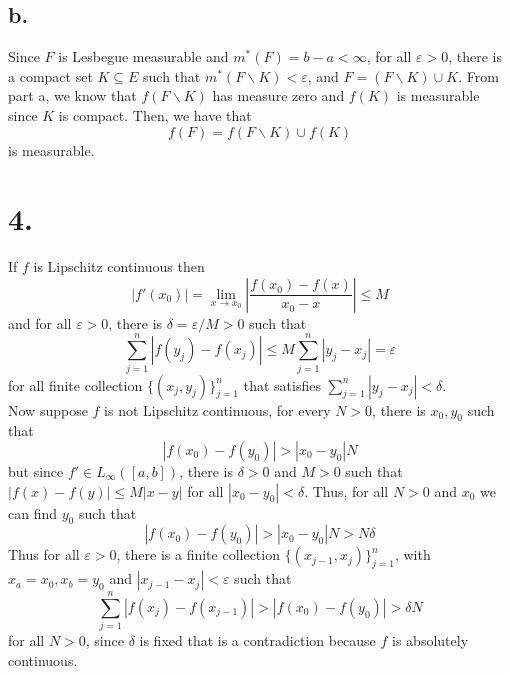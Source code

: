 \documentclass[11pt]{article}
\theoremstyle{mystyle}
\theoremstyle{definition}
\begin{document}
\subsection*{b.}
Since $F$ is Lesbegue measurable and $m^*(F) = b-a < \infty$, for all $\varepsilon > 0$, there is a compact set $K \subseteq E$ such that $m^*(F\backslash K) < \varepsilon$, and $F = (F\backslash K) \cup K$. From part a, we know that $f(F \backslash K)$ has measure zero and $f(K)$ is measurable since $K$ is compact. Then, we have that 
\[
  f(F) = f(F \backslash K) \cup f(K)
\]
is measurable.
\newpage
\section*{4.}
If $f$ is Lipschitz continuous then 
\[
  |f'(x_0)| = \lim_{x \to x_0} \left|\displaystyle\frac{f(x_0) - f(x)}{x_0-x}\right| \le M 
\]
and for all $\varepsilon > 0$, there is $\delta = \varepsilon/M > 0$ such that
\[
  \sum_{j=1}^n |f(y_j) - f(x_j)| \le M \sum_{j=1}^n |y_j - x_j| = \varepsilon
\]
for all finite collection $\{(x_j, y_j)\}_{j=1}^n$ that satisfies $\sum_{j=1}^n |y_j - x_j| < \delta$. \\
Now suppose $f$ is not Lipschitz continuous, for every $N>0$, there is $x_0, y_0$ such that  
\[
  |f(x_0) - f(y_0)| > |x_0-y_0|N 
\]
but since $f' \in L_\infty ([a,b])$, there is $\delta > 0$ and $M> 0$ such that $|f(x) - f(y)| \le M|x-y|$ for all $|x_0 - y_0|< \delta$. Thus, for all $N>0$ and $x_0$ we can find $y_0$ such that 
\[
  |f(x_0) - f(y_0)| > |x_0 - y_0|N > N\delta
\]
Thus for all $\varepsilon > 0$, there is a finite collection $\{(x_{j-1}, x_j)\}_{j=1}^n$, with $x_a = x_0, x_b = y_0$ and $|x_{j-1} - x_j| < \varepsilon$ such that  
\[
  \sum_{j=1}^n |f(x_{j}) - f(x_{j-1})| > |f(x_0) - f(y_0)| > \delta N
\]
for all $N> 0$, since $\delta$ is fixed that is a contradiction because $f$ is absolutely continuous. 
\end{document}
